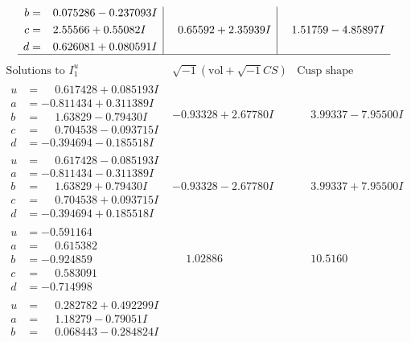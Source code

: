 \documentclass[1p]{elsarticle_modified}
\theoremstyle{definition}
\newcommand{\I}{\sqrt{-1}}
\begin{document}
$$\begin{array}{c|c|c}
\begin{aligned}
b &= \phantom{-}0.075286 - 0.237093 I \\
c &= \phantom{-}2.55566 + 0.55082 I \\
d &= \phantom{-}0.626081 + 0.080591 I\end{aligned}
 & \phantom{-}0.65592 + 2.35939 I & \phantom{-}1.51759 - 4.85897 I\\
 \hline 
 \end{array}$$\newpage$$\begin{array}{c|c|c}  
\text{Solutions to }I^u_{1}& \I (\text{vol} + \sqrt{-1}CS) & \text{Cusp shape}\\
 \hline 
\begin{aligned}
u &= \phantom{-}0.617428 + 0.085193 I \\
a &= -0.811434 + 0.311389 I \\
b &= \phantom{-}1.63829 - 0.79430 I \\
c &= \phantom{-}0.704538 - 0.093715 I \\
d &= -0.394694 - 0.185518 I\end{aligned}
 & -0.93328 + 2.67780 I & \phantom{-}3.99337 - 7.95500 I \\ \hline\begin{aligned}
u &= \phantom{-}0.617428 - 0.085193 I \\
a &= -0.811434 - 0.311389 I \\
b &= \phantom{-}1.63829 + 0.79430 I \\
c &= \phantom{-}0.704538 + 0.093715 I \\
d &= -0.394694 + 0.185518 I\end{aligned}
 & -0.93328 - 2.67780 I & \phantom{-}3.99337 + 7.95500 I \\ \hline\begin{aligned}
u &= -0.591164\phantom{ +0.000000I} \\
a &= \phantom{-}0.615382\phantom{ +0.000000I} \\
b &= -0.924859\phantom{ +0.000000I} \\
c &= \phantom{-}0.583091\phantom{ +0.000000I} \\
d &= -0.714998\phantom{ +0.000000I}\end{aligned}
 & \phantom{-}1.02886\phantom{ +0.000000I} & \phantom{-}10.5160\phantom{ +0.000000I} \\ \hline\begin{aligned}
u &= \phantom{-}0.282782 + 0.492299 I \\
a &= \phantom{-}1.18279 - 0.79051 I \\
b &= \phantom{-}0.068443 - 0.284824 I \\

\end{aligned}
\end{array}$$
\end{document}
